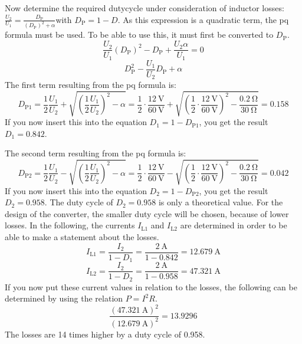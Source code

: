 \begin{solutionblock}
Now determine the required dutycycle under consideration of inductor losses:
$\frac{U_\mathrm{2}}{U_\mathrm{1}}=\frac{D_\mathrm{P}}{(D_\mathrm{P})^2+\alpha}$with $D_\mathrm{P}=1-D$.
As this expression is a quadratic term, the pq formula must be used. To be able to use this, it must first be converted to $D_\mathrm{P}$.
\begin{equation}
    \frac{U_\mathrm{2}}{U_\mathrm{1}}(D_\mathrm{P})^2-D_\mathrm{P}+\frac{U_\mathrm{2}\alpha}{U_\mathrm{1}}=0
\end{equation}
\begin{equation}
    D_\mathrm{P}^2 - \frac{U_\mathrm{1}}{U_\mathrm{2}} D_\mathrm{P}+\alpha
\end{equation}
The first term resulting from the pq formula is:
\begin{equation}
    D_\mathrm{P1}=\frac{1}{2}\frac{U_\mathrm{1}}{U_\mathrm{2}}+\sqrt{(\frac{1}{2}\frac{U_\mathrm{1}}{U_\mathrm{2}})^2-\alpha}= \frac{1}{2}\cdot\frac{\SI{12}{\volt}}{\SI{60}{\volt}}+\sqrt{({\frac{1}{2}}\cdot\frac{\SI{12}{\volt}}{\SI{60}{\volt}})^2-\frac{\SI{0.2}{\ohm}}{\SI{30}{\ohm}}}= 0.158
\end{equation}
If you now insert this into the equation $D_\mathrm{1}=1-D_\mathrm{P1}$, you get the result $D_\mathrm{1}=0.842$.

The second term resulting from the pq formula is:
\begin{equation}
    D_\mathrm{P2}=\frac{1}{2}\frac{U_\mathrm{1}}{U_\mathrm{2}}-\sqrt{(\frac{1}{2}\frac{U_\mathrm{1}}{U_\mathrm{2}})^2-\alpha}= \frac{1}{2}\cdot\frac{\SI{12}{\volt}}{\SI{60}{\volt}}-\sqrt{({\frac{1}{2}}\cdot\frac{\SI{12}{\volt}}{\SI{60}{\volt}})^2-\frac{\SI{0.2}{\ohm}}{\SI{30}{\ohm}}}= 0.042
\end{equation}
If you now insert this into the equation $D_\mathrm{2}=1-D_\mathrm{P2}$, you get the result $D_\mathrm{2}=0.958$.
The duty cycle of $D_\mathrm{2}=0.958$ is only a theoretical value. For the design of the converter, the smaller duty cycle will be chosen, because of lower losses.
In the following, the currents $I_\mathrm{L1}$ and $I_\mathrm{L2}$ are determined in order to be able to make a statement about the losses.
\begin{equation}
    I_\mathrm{L1} = \frac{I_\mathrm{2}}{1-D_\mathrm{1}}= \frac{\SI{2}{\ampere}}{1-0.842}=\SI{12.679}{\ampere}
\end{equation}
\begin{equation}
    I_\mathrm{L2} = \frac{I_\mathrm{2}}{1-D_\mathrm{2}}= \frac{\SI{2}{\ampere}}{1-0.958}=\SI{47.321}{\ampere}
\end{equation}
If you now put these current values in relation to the losses, the following can be determined by using the relation $P=I^2R$.
\begin{equation}
    \frac{(\SI{47.321}{\ampere})^2}{(\SI{12.679}{\ampere})^2}=13.9296
\end{equation}
The losses are 14 times higher by a duty cycle of 0.958. 



\end{solutionblock}
